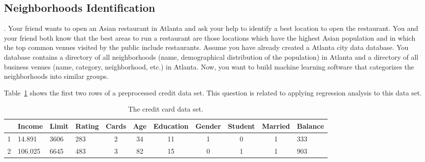 \documentclass[addpoints,11pt]{exam}
\begin{document}
\begin{questions}
\begin{parts}
\part[3] {\textbf{Neighborhoods Identification}}. Your friend wants to open an Asian restaurant in Atlanta and ask your help to identify a best location to open the restaurant. You and your friend both know that the best areas to run a restaurant are those locations which have the highest Asian population and in which the top common venues visited by the public include restaurants. Assume you have already created a Atlanta city data database. You database contains a directory of all neighborhoods (name, demographical distribution of the population) in Atlanta and a directory of all business venues (name, category, neighborhood, etc.) in Atlanta. Now, you want to build machine learning software that categorizes the neighborhoods into similar groups.
\vspace{2.5in}

\end{parts}
\newpage

\newpage
\addpoints
\question[20] Table~\ref{credit_data} shows the first two rows of a preprocessed credit data set. This question is related to applying regression analysis to this data set.
\begin{table}[h]
  \centering
  \caption{The credit card data set.}\label{credit_data}
  \begin{tabular}{c l  l l c c c c c c l}
    \hline
    & Income &	Limit & Rating & Cards& Age & Education & Gender & Student & Married & Balance\\
\hline
1	& 14.891	& 3606	& 283	& 2	& 34	& 11 &	1	& 0	& 1	& 333 \\
2	& 106.025	& 6645	& 483	& 3	& 82	& 15 &	0	& 1	& 1	& 903 \\   \hline
  \end{tabular}
\end{table}



\end{questions}
\end{document}
